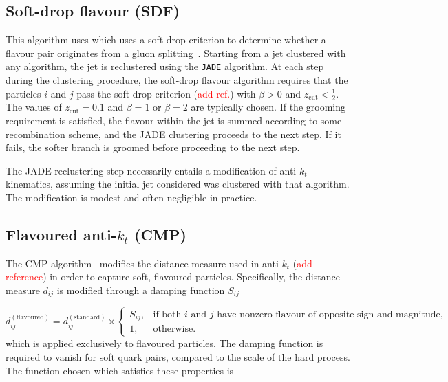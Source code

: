 \documentclass[10pt,a4paper]{book}
\newcommand{\code}[1]{\texttt{#1}}
\begin{document}
\subsection{Soft-drop flavour (SDF)}

This algorithm uses which uses a soft-drop criterion to determine whether a flavour pair originates from a gluon splitting~\cite{Caletti:2022hnc}. Starting from a jet clustered with any algorithm, the jet is reclustered using the \code{JADE} algorithm. At each step during the clustering procedure, the soft-drop flavour algorithm requires that the particles $i$ and $j$ pass the soft-drop criterion (\textcolor{red}{add ref.}) with $\beta > 0$ and $z_\text{cut} < \frac{1}2$. The values of $z_\text{cut} = 0.1$ and $\beta = 1$ or $\beta = 2$ are typically chosen. If the grooming requirement is satisfied, the flavour within the jet is summed according to some recombination scheme, and the JADE clustering proceeds to the next step. If it fails, the softer branch is groomed before proceeding to the next step.  


The JADE reclustering step necessarily entails a modification of anti-$k_t$ kinematics, assuming the initial jet considered was clustered with that algorithm. The modification is modest and often negligible in practice. 

\subsection{Flavoured anti-$k_t$ (CMP)}

The CMP algorithm~\cite{Czakon:2022wam} modifies the distance measure used in anti-$k_t$ (\textcolor{red}{add reference}) in order to capture soft, flavoured particles. Specifically, the distance measure $d_{ij}$ is modified through a damping function $S_{ij}$

\begin{equation}
    d_{ij}^{(\text{flavoured})} = d_{ij}^{(\text{standard})} \times 
    \begin{cases} 
      S_{ij}, & \text{if both } i \text{ and } j \text{ have nonzero flavour of opposite sign and magnitude,} \\
      1, & \text{otherwise.}
    \end{cases}
    \label{eq:flavoured_distance}
\end{equation}
which is applied exclusively to flavoured particles. The damping function is required to vanish for soft quark pairs, compared to the scale of the hard process. The function chosen which satisfies these properties is
\end{document}
